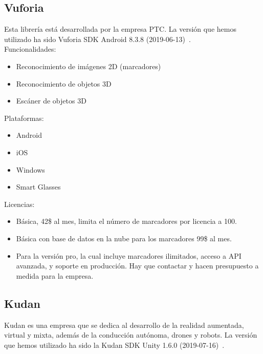 \subsection{Vuforia}

Esta librería está desarrollada por la empresa PTC. La versión que hemos utilizado ha sido Vuforia SDK Android 8.3.8 (2019-06-13)~\cite{Vuforia}.\\

Funcionalidades:
\begin{itemize}
\item Reconocimiento de imágenes 2D (marcadores)
\item Reconocimiento de objetos 3D
\item Escáner de objetos 3D
\end{itemize}
Plataformas:
\begin{itemize}
\item Android
\item iOS
\item Windows
\item Smart Glasses
\end{itemize}
Licencias:
\begin{itemize}
\item Básica, 42\$ al mes, limita el número de marcadores por licencia a 100.
\item Básica con base de datos en la nube para los marcadores 99\$ al mes.
\item Para la versión pro, la cual incluye marcadores ilimitados, acceso a API avanzada, y soporte en producción. Hay que contactar y hacen presupuesto a medida para la empresa.
\end{itemize}


\subsection{Kudan}


Kudan es una empresa que se dedica al desarrollo de la realidad aumentada, virtual y mixta, además de la conducción autónoma, drones y robots. La versión que hemos utilizado ha sido la Kudan SDK Unity 1.6.0 (2019-07-16)~\cite{Kudan}.\\

